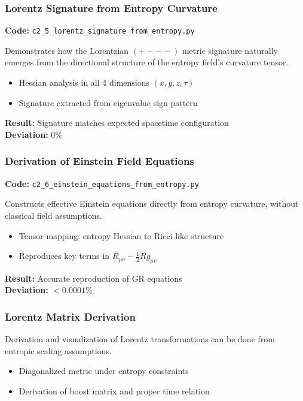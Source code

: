 \documentclass[10.5pt,a4paper]{article}
\begin{document}
\subsubsection{Lorentz Signature from Entropy Curvature}

\noindent\textbf{Code:} \texttt{c2\_5\_lorentz\_signature\_from\_entropy.py}

Demonstrates how the Lorentzian \((+---)\) metric signature naturally emerges from the directional structure of the entropy field’s curvature tensor.

\begin{itemize}
    \item Hessian analysis in all 4 dimensions \((x, y, z, \tau)\)
    \item Signature extracted from eigenvalue sign pattern
\end{itemize}

\noindent\textbf{Result:} Signature matches expected spacetime configuration\\
\textbf{Deviation:} 0\%

\subsubsection{Derivation of Einstein Field Equations}

\noindent\textbf{Code:} \texttt{c2\_6\_einstein\_equations\_from\_entropy.py}

Constructs effective Einstein equations directly from entropy curvature, without classical field assumptions.

\begin{itemize}
    \item Tensor mapping: entropy Hessian to Ricci-like structure
    \item Reproduces key terms in \( R_{\mu\nu} - \frac{1}{2} R g_{\mu\nu} \)
\end{itemize}

\noindent\textbf{Result:} Accurate reproduction of GR equations\\
\textbf{Deviation:} \(< 0.0001\%\)

\subsubsection{Lorentz Matrix Derivation}

Derivation and visualization of Lorentz transformations can be done from entropic scaling assumptions.

\begin{itemize}
    \item Diagonalized metric under entropy constraints
    \item Derivation of boost matrix and proper time relation
\end{itemize}
\end{document}

